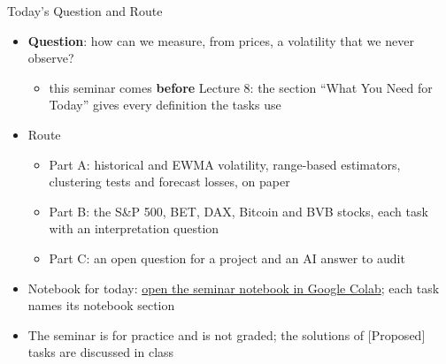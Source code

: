 \begin{frame}{Today's Question and Route}
\itemsize{\small}
\begin{itemize}
    \item \textbf{Question}: how can we measure, from prices, a volatility that we never observe?
    \begin{itemize}
        \item this seminar comes \textbf{before} Lecture 8: the section ``What You Need for Today'' gives every definition the tasks use
    \end{itemize}
    \item Route
    \begin{itemize}
        \item Part A: historical and EWMA volatility, range-based estimators, clustering tests and forecast losses, on paper
        \item Part B: the S\&P 500, BET, DAX, Bitcoin and BVB stocks, each task with an interpretation question
        \item Part C: an open question for a project and an AI answer to audit
    \end{itemize}
    \item Notebook for today: \href{\nb}{open the seminar notebook in Google Colab}; each task names its notebook section
    \item The seminar is for practice and is not graded; the solutions of [Proposed] tasks are discussed in class
\end{itemize}
\end{frame}

